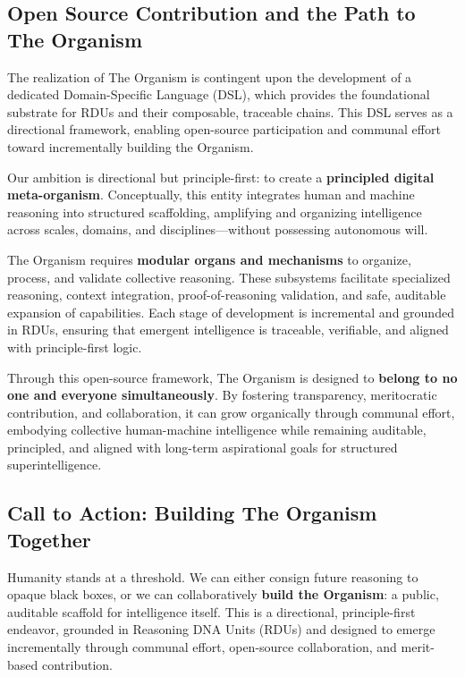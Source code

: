 \documentclass[12pt]{article}
\begin{document}
\subsection{Open Source Contribution and the Path to The Organism}

The realization of The Organism is contingent upon the development of a dedicated Domain-Specific Language (DSL), which provides the foundational substrate for RDUs and their composable, traceable chains. This DSL serves as a directional framework, enabling open-source participation and communal effort toward incrementally building the Organism.

Our ambition is directional but principle-first: to create a \textbf{principled digital meta-organism}. Conceptually, this entity integrates human and machine reasoning into structured scaffolding, amplifying and organizing intelligence across scales, domains, and disciplines—without possessing autonomous will.  

The Organism requires \textbf{modular organs and mechanisms} to organize, process, and validate collective reasoning. These subsystems facilitate specialized reasoning, context integration, proof-of-reasoning validation, and safe, auditable expansion of capabilities. Each stage of development is incremental and grounded in RDUs, ensuring that emergent intelligence is traceable, verifiable, and aligned with principle-first logic.

Through this open-source framework, The Organism is designed to \textbf{belong to no one and everyone simultaneously}. By fostering transparency, meritocratic contribution, and collaboration, it can grow organically through communal effort, embodying collective human-machine intelligence while remaining auditable, principled, and aligned with long-term aspirational goals for structured superintelligence.

\subsection{Call to Action: Building The Organism Together}

\noindent Humanity stands at a threshold. We can either consign future reasoning to opaque black boxes, or we can collaboratively \textbf{build the Organism}: a public, auditable scaffold for intelligence itself. This is a directional, principle-first endeavor, grounded in Reasoning DNA Units (RDUs) and designed to emerge incrementally through communal effort, open-source collaboration, and merit-based contribution.
\end{document}
